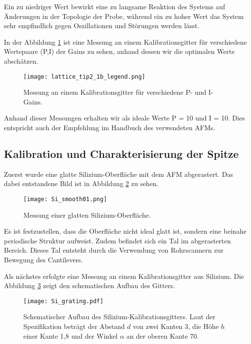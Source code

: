 Ein zu niedriger Wert bewirkt eine zu langsame Reaktion des Systems auf Änderungen in der Topologie der Probe, während ein zu hoher Wert das System sehr empfindlich gegen Oszillationen und Störungen werden lässt.

In der Abbildung \ref{fig:gain} ist eine Messung an einem Kalibrationsgitter für verschiedene Wertepaare (P,I) der Gains zu sehen, anhand dessen wir die optimalen Werte abschätzen.
\begin{figure}[h]
	\centering
	\texttt{[image: lattice\_tip2\_1b\_legend.png]}
	\caption[Bestimmung des P- und I-Gains]{Messung an einem Kalibrationsgitter für verschiedene P- und I-Gains.}
\label{fig:gain}
\end{figure}

Anhand dieser Messungen erhalten wir als ideale Werte P = 10 und I = 10. Dies entspricht auch der Empfehlung im Handbuch des verwendeten AFMs.

\newpage
\subsection{Kalibration und Charakterisierung der Spitze}
Zuerst wurde eine glatte Silizium-Oberfläche mit dem AFM abgerastert. Das dabei entstandene Bild ist in Abbildung \ref{fig:Si_smooth01} zu sehen.
\begin{figure}[h]
	\centering
	\texttt{[image: Si\_smooth01.png]}
	\caption{Messung einer glatten Silizium-Oberfläche.}
	\label{fig:Si_smooth01}
\end{figure}

Es ist festzustellen, dass die Oberfläche nicht ideal glatt ist, sondern eine beinahe periodische Struktur aufweist. Zudem befindet sich ein Tal im abgerasterten Bereich. Dieses Tal entsteht durch die Verwendung von Rohrscannern zur Bewegung des Cantilevers.

Als nächstes erfolgte eine Messung an einem Kalibrationsgitter aus Silizium. Die Abbildung \ref{fig:Si_grating} zeigt den schematischen Aufbau des Gitters.
\begin{figure}[H]
	\centering
	\texttt{[image: Si\_grating.pdf]}
	\caption[Schematischer Aufbau des Silizium-Kalibrationsgitters]{Schematischer Aufbau des Silizium-Kalibrationsgitters. Laut der Spezifikation beträgt der Abstand $d$ von zwei Kanten 3\micro\metre, die Höhe $h$ einer Kante 1,8\micro\metre{} und der Winkel $\alpha$ an der oberen Kante 70\degree.}
	\label{fig:Si_grating}
\end{figure}

